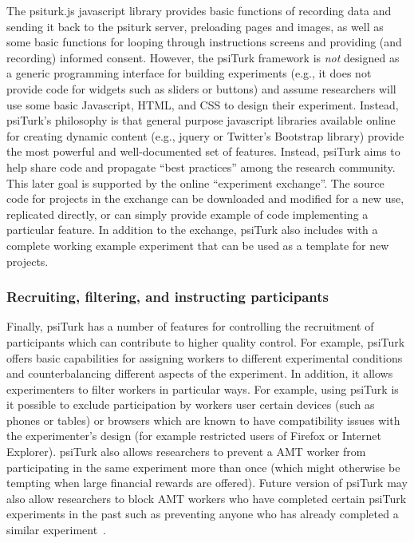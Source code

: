 \documentclass[twocolumn]{svjour3}          %
\begin{document}
The psiturk.js javascript library provides basic functions of recording data and sending it back to the psiturk server,
preloading pages and images, as well as some basic functions for looping through instructions
screens and providing (and recording) informed consent.
However, the \textsf{psiTurk} framework is \emph{not} designed as a generic
programming interface for building 
experiments (e.g., it does not provide code for widgets such as sliders or buttons) and assume
researchers will use some basic Javascript, HTML, and CSS to design their experiment.  Instead, \textsf{psiTurk}'s
philosophy is that general purpose javascript libraries available online for creating dynamic content (e.g., jquery or
Twitter's Bootstrap library) provide the most powerful and well-documented set of features.  Instead, \textsf{psiTurk}
aims to help share code and propagate ``best practices'' among the research community.
This later goal is supported by the online ``experiment exchange''.
The source code for projects in the exchange can be downloaded and modified for a new use,
replicated directly, or can simply provide example of code implementing a particular 
feature.  In addition to the exchange, \textsf{psiTurk} also includes with a complete working example 
experiment that can be used as a template for new projects.



\subsubsection{Recruiting, filtering, and instructing participants}
Finally, \textsf{psiTurk} has a number of features for controlling the recruitment
of participants which can contribute to higher quality control.
For example, \textsf{psiTurk} offers basic capabilities for assigning workers to different experimental conditions 
and counterbalancing different aspects of the experiment.
In addition, it allows experimenters to filter workers in particular ways.  For example, using \textsf{psiTurk}
is it possible to exclude participation by workers user certain devices (such as phones or tables) or browsers
which are known to have compatibility issues with the experimenter's design (for example restricted
users of Firefox or Internet Explorer).  \textsf{psiTurk} also allows researchers to prevent a AMT worker from 
participating in the same experiment more than once (which might otherwise be tempting when
large financial rewards are offered).  Future version of \textsf{psiTurk} may also allow researchers to 
block AMT workers who have completed certain \textsf{psiTurk} experiments in the past such as
preventing anyone who has already completed a similar experiment~\citep[see][for a discussion about non-naivety amongst AMT workers]{chandler2014nonnaivete}.
\end{document}
